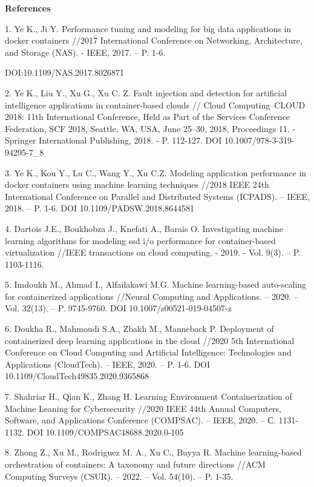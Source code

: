 \begin{center}
{\bfseries References}
\end{center}

\begin{noparindent}

1.
Ye K., Ji Y. Performance tuning and modeling for big data applications
in docker containers //2017 International Conference on Networking,
Architecture, and Storage (NAS). - IEEE, 2017. -- P. 1-6.

DOI:10.1109/NAS.2017.8026871

2.
Ye K., Liu Y., Xu G., Xu C. Z. Fault injection and detection for
artificial intelligence applications in container-based clouds //
Cloud Computing--CLOUD 2018: 11th International Conference, Held as
Part of the Services Conference Federation, SCF 2018, Seattle, WA,
USA, June 25--30, 2018, Proceedings 11. - Springer International
Publishing, 2018. - P. 112-127. DOI 10.1007/978-3-319-94295-7\_8

3.
Ye K., Kou Y., Lu C., Wang Y., Xu C.Z. Modeling application
performance in docker containers using machine learning techniques
//2018 IEEE 24th International Conference on Parallel and Distributed
Systems (ICPADS). -- IEEE, 2018. -- P. 1-6. DOI
10.1109/PADSW.2018.8644581

4.
Dartois J.E., Boukhobza J., Knefati A., Barais O. Investigating
machine learning algorithms for modeling ssd i/o performance for
container-based virtualization //IEEE transactions on cloud computing.
- 2019. - Vol. 9(3). -- P. 1103-1116.

5.
Imdoukh M., Ahmad I., Alfailakawi M.G. Machine learning-based
auto-scaling for containerized applications //Neural Computing and
Applications. -- 2020. -- Vol. 32(13). -- P. 9745-9760. DOI
10.1007/s00521-019-04507-z

6.
Doukha R., Mahmoudi S.A., Zbakh M., Manneback P. Deployment of
containerized deep learning applications in the cloud //2020 5th
International Conference on Cloud Computing and Artificial
Intelligence: Technologies and Applications (CloudTech). -- IEEE,
2020. -- P. 1-6. DOI 10.1109/CloudTech49835.2020.9365868

7.
Shahriar H., Qian K., Zhang H. Learning Environment Containerization
of Machine Leaning for Cybersecurity //2020 IEEE 44th Annual
Computers, Software, and Applications Conference (COMPSAC). -- IEEE,
2020. -- С. 1131-1132. DOI 10.1109/COMPSAC48688.2020.0-105

8.
Zhong Z., Xu M., Rodriguez M. A., Xu C., Buyya R. Machine
learning-based orchestration of containers: A taxonomy and future
directions //ACM Computing Surveys (CSUR). -- 2022. -- Vol. 54(10). --
P. 1-35.


\end{noparindent}
